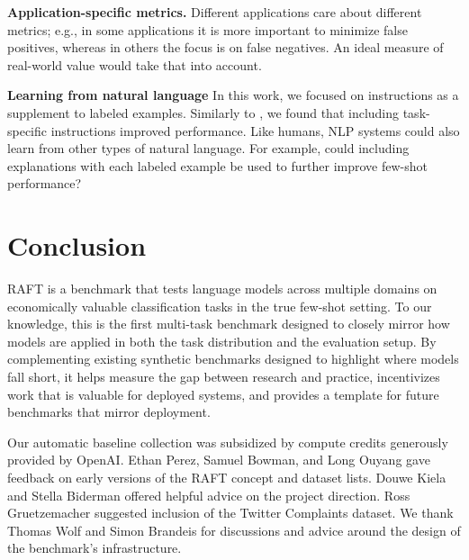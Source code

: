 \documentclass{article}
\newcommand{\name}{\textsc{RAFT}}
\begin{document}
\textbf{Application-specific metrics.} Different applications care about different metrics; e.g., in some applications it is more important to minimize false positives, whereas in others the focus is on false negatives. An ideal measure of real-world value would take that into account. 

\textbf{Learning from natural language} In this work, we focused on instructions as a supplement to labeled examples. Similarly to \citet{mishra2021natural}, we found that including task-specific instructions improved performance. Like humans, NLP systems could also learn from other types of natural language. For example, could including explanations with each labeled example be used to further improve few-shot performance?


\section{Conclusion}

\name{} is a benchmark that tests language models across multiple domains on economically valuable classification tasks in the true few-shot setting. To our knowledge, this is the first multi-task benchmark designed to closely mirror how models are applied in both the task distribution and the evaluation setup. By complementing existing synthetic benchmarks designed to highlight where models fall short, it helps measure the gap between research and practice, incentivizes work that is valuable for deployed systems, and provides a template for future benchmarks that mirror deployment.



\begin{ack}

Our automatic baseline collection was subsidized by compute credits generously provided by OpenAI. Ethan Perez, Samuel Bowman, and Long Ouyang gave feedback on early versions of the \name{} concept and dataset lists. Douwe Kiela and Stella Biderman offered helpful advice on the project direction. Ross Gruetzemacher suggested inclusion of the Twitter Complaints dataset.  We thank Thomas Wolf and Simon Brandeis for discussions and advice around the design of the benchmark’s infrastructure.

\end{ack}







\iffalse
\end{document}

